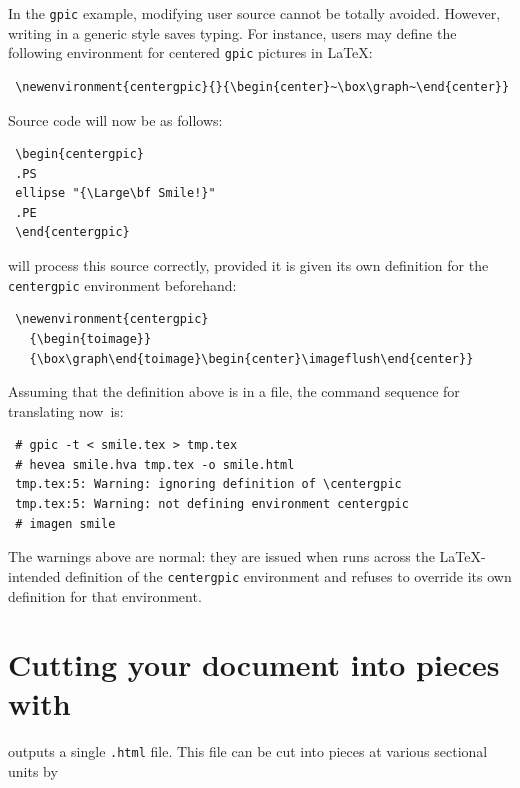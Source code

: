 In the \texttt{gpic} example, modifying user source cannot be totally avoided.
However, writing in a generic style saves typing.
For instance, users may define the following environment for
centered \texttt{gpic} pictures in \LaTeX{}:
\begin{verbatim}
 \newenvironment{centergpic}{}{\begin{center}~\box\graph~\end{center}}
\end{verbatim}
Source code will now be as follows:
\begin{verbatim}
 \begin{centergpic}
 .PS
 ellipse "{\Large\bf Smile!}"
 .PE
 \end{centergpic}
\end{verbatim}
\hevea{} will process this source correctly, provided it is given its
own definition for the \verb+centergpic+ environment beforehand:
\begin{verbatim}
 \newenvironment{centergpic}
   {\begin{toimage}}
   {\box\graph\end{toimage}\begin{center}\imageflush\end{center}}
\end{verbatim}
Assuming that the definition above is in a  file,
the command sequence for translating
 \mbox{now is}:
\begin{verbatim}
 # gpic -t < smile.tex > tmp.tex
 # hevea smile.hva tmp.tex -o smile.html
 tmp.tex:5: Warning: ignoring definition of \centergpic
 tmp.tex:5: Warning: not defining environment centergpic
 # imagen smile
\end{verbatim}
The warnings above are normal: they are issued when \hevea{} runs
across the \LaTeX{}-intended definition of the \verb+centergpic+
environment and refuses to override its own definition for that
environment.


\section{\label{hacha}Cutting your document into pieces with \hacha}
\hevea{} outputs a single \texttt{.html} file. This file can be
cut into pieces at various sectional units by {\hacha}

